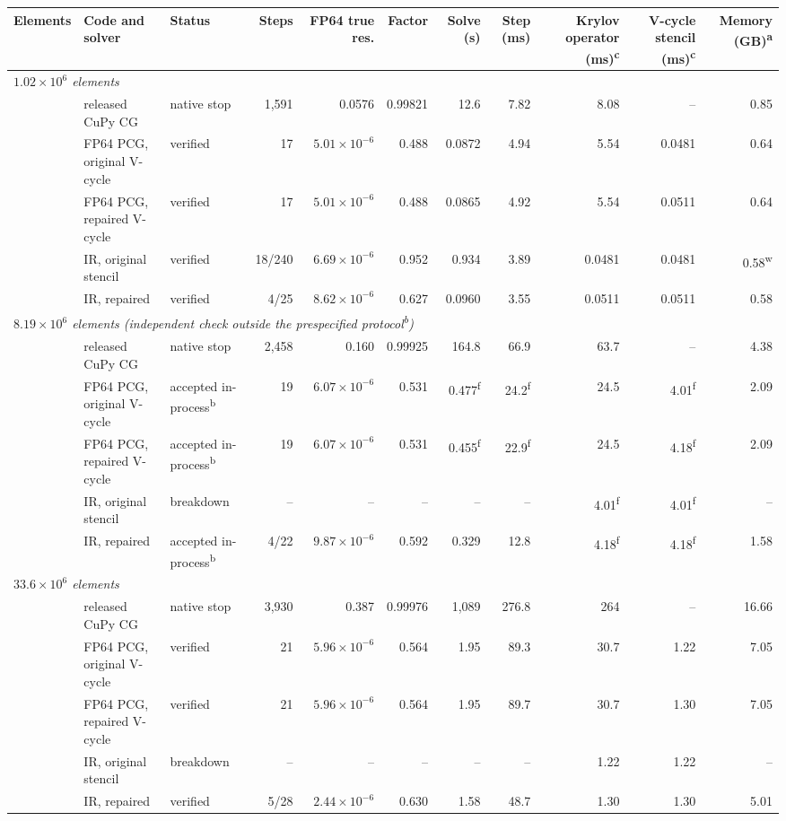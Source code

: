 \begin{tabular}{rllrrrrrrrr}
\toprule
Elements & Code and solver & Status & Steps & FP64 true res. & Factor & Solve (s) & Step (ms) & Krylov operator (ms)\textsuperscript{c} & V-cycle stencil (ms)\textsuperscript{c} & Memory (GB)\textsuperscript{a} \\
\midrule
\multicolumn{11}{l}{\emph{$1.02\times10^{6}$ elements}} \\
 & released CuPy CG & native stop & 1{,}591 & 0.0576 & 0.99821 & 12.6 & 7.82 & 8.08 & -- & 0.85 \\
 & FP64 PCG, original V-cycle & verified & 17 & $5.01\times10^{-6}$ & 0.488 & 0.0872 & 4.94 & 5.54 & 0.0481 & 0.64 \\
 & FP64 PCG, repaired V-cycle & verified & 17 & $5.01\times10^{-6}$ & 0.488 & 0.0865 & 4.92 & 5.54 & 0.0511 & 0.64 \\
 & IR, original stencil & verified & 18/240 & $6.69\times10^{-6}$ & 0.952 & 0.934 & 3.89 & 0.0481 & 0.0481 & 0.58\textsuperscript{w} \\
 & IR, repaired & verified & 4/25 & $8.62\times10^{-6}$ & 0.627 & 0.0960 & 3.55 & 0.0511 & 0.0511 & 0.58 \\
\midrule
\multicolumn{11}{l}{\emph{$8.19\times10^{6}$ elements (independent check outside the prespecified protocol\textsuperscript{b})}} \\
 & released CuPy CG & native stop & 2{,}458 & 0.160 & 0.99925 & 164.8 & 66.9 & 63.7 & -- & 4.38 \\
 & FP64 PCG, original V-cycle & accepted in-process\textsuperscript{b} & 19 & $6.07\times10^{-6}$ & 0.531 & 0.477\textsuperscript{f} & 24.2\textsuperscript{f} & 24.5 & 4.01\textsuperscript{f} & 2.09 \\
 & FP64 PCG, repaired V-cycle & accepted in-process\textsuperscript{b} & 19 & $6.07\times10^{-6}$ & 0.531 & 0.455\textsuperscript{f} & 22.9\textsuperscript{f} & 24.5 & 4.18\textsuperscript{f} & 2.09 \\
 & IR, original stencil & breakdown & -- & -- & -- & -- & -- & 4.01\textsuperscript{f} & 4.01\textsuperscript{f} & -- \\
 & IR, repaired & accepted in-process\textsuperscript{b} & 4/22 & $9.87\times10^{-6}$ & 0.592 & 0.329 & 12.8 & 4.18\textsuperscript{f} & 4.18\textsuperscript{f} & 1.58 \\
\midrule
\multicolumn{11}{l}{\emph{$33.6\times10^{6}$ elements}} \\
 & released CuPy CG & native stop & 3{,}930 & 0.387 & 0.99976 & 1{,}089 & 276.8 & 264 & -- & 16.66 \\
 & FP64 PCG, original V-cycle & verified & 21 & $5.96\times10^{-6}$ & 0.564 & 1.95 & 89.3 & 30.7 & 1.22 & 7.05 \\
 & FP64 PCG, repaired V-cycle & verified & 21 & $5.96\times10^{-6}$ & 0.564 & 1.95 & 89.7 & 30.7 & 1.30 & 7.05 \\
 & IR, original stencil & breakdown & -- & -- & -- & -- & -- & 1.22 & 1.22 & -- \\
 & IR, repaired & verified & 5/28 & $2.44\times10^{-6}$ & 0.630 & 1.58 & 48.7 & 1.30 & 1.30 & 5.01 \\
\bottomrule
\end{tabular}
